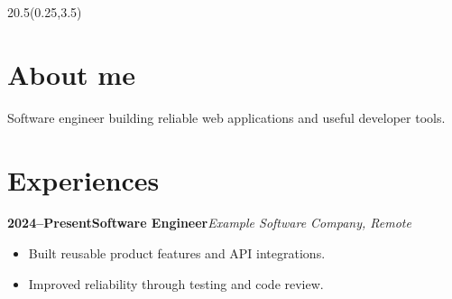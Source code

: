 \documentclass[a4paper]{arthur-cv}
\begin{document}
\makeprofile
\begin{textblock}{20.5}(0.25,3.5)
\begin{minipage}[t]{0.37\textwidth}
\end{minipage}\hfill\begin{minipage}[t]{0.61\textwidth}
\section{About me}
Software engineer building reliable web applications and useful developer tools.
\section{Experiences}
\textbf{2024--Present}\quad\textbf{Software Engineer}\quad\textit{Example Software Company, Remote}
\begin{itemize}[leftmargin=5mm,topsep=1mm,itemsep=0mm]
\item Built reusable product features and API integrations.
\item Improved reliability through testing and code review.
\end{itemize}
\end{minipage}
\end{textblock}
\end{document}

